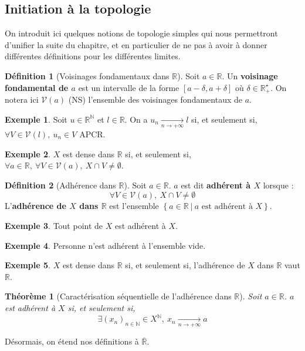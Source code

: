 \documentclass[french]{book}
\newcommand{\N}{\mathbb{N}}
\newcommand{\R}{\mathbb{R}}
\newcommand{\st}{^\star}
\theoremstyle{plain}
\newtheorem{thm}{Théorème}[chapter]
\theoremstyle{definition}
\newtheorem{dfn}{Définition}[chapter]
\newtheorem{exa}{Exemple}[chapter]
\theoremstyle{remark}
\begin{document}
\subsection{Initiation à la topologie}
On introduit ici quelques notions de topologie simples qui nous permettront d'unifier la suite du chapitre, et en particulier de ne pas à avoir à donner différentes définitions pour les différentes limites.
\begin{dfn}[Voisinages fondamentaux dans $\R$]
	Soit $a\in\R$. Un \textbf{voisinage fondamental de $a$} est un intervalle de la forme $[a-\delta,a+\delta]$ où $\delta\in\R_+\st$. On notera ici $\mathcal{V}(a)$ (NS) l'ensemble des voisinages fondamentaux de $a$.
\end{dfn}
\begin{exa}
	Soit $u\in\R^\N$ et $l\in\R$. On a $u_n\xrightarrow[n\to+\infty]{}l$ si, et seulement si, $\forall V\in\mathcal{V}(l),\ u_n\in V$ APCR.
\end{exa}
\begin{exa}
	$X$ est dense dans $\R$ si, et seulement si, $\forall a\in\R,\ \forall V\in\mathcal{V}(a),\ X\cap V\ne\emptyset$.
\end{exa}
\begin{dfn}[Adhérence dans $\R$]
	Soit $a\in\R$. $a$ est dit \textbf{adhérent à $X$} lorsque : $$\forall V\in\mathcal{V}(a),\ X\cap V\ne\emptyset$$ L'\textbf{adhérence de $X$ dans $\R$} est l'ensemble $\left\{a\in\R\ | \ a\text{ est adhérent à }X\right\}$.
\end{dfn}
\begin{exa}
	Tout point de $X$ est adhérent à $X$.
\end{exa}
\begin{exa}
	Personne n'est adhérent à l'ensemble vide.
\end{exa}
\begin{exa}
	$X$ est dense dans $\R$ si, et seulement si, l'adhérence de $X$ dans $\R$ vaut $\R$.
\end{exa}
\begin{thm}[Caractérisation séquentielle de l'adhérence dans $\R$]
	Soit $a\in\R$. $a$ est adhérent à $X$ si, et seulement si, $$\exists(x_n)_{n\in\N}\in X^\N,\ x_n\xrightarrow[n\to+\infty]{}a$$
\end{thm}
Désormais, on étend nos définitions à $\overline{\R}$.
\end{document}
